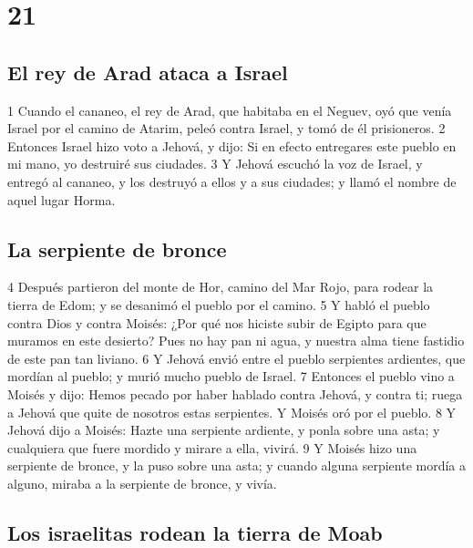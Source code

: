 \chapter{21}

\section*{El rey de Arad ataca a Israel}

1 Cuando el cananeo, el rey de Arad, que habitaba en el Neguev, oyó que venía Israel  por el camino de Atarim, peleó contra Israel, y tomó de él prisioneros.
2 Entonces Israel hizo voto a Jehová, y dijo: Si en efecto entregares este pueblo en mi mano, yo destruiré sus ciudades.
3 Y Jehová escuchó la voz de Israel, y entregó al cananeo, y los destruyó a ellos y a sus ciudades; y llamó el nombre de aquel lugar Horma.

\section*{La serpiente de bronce }

4 Después partieron del monte de Hor, camino del Mar Rojo, para rodear la tierra de Edom; y se desanimó el pueblo por el camino.
5 Y habló el pueblo contra Dios y contra Moisés: ¿Por qué nos hiciste subir de Egipto para que muramos en este desierto? Pues no hay pan ni agua, y nuestra alma tiene fastidio de este pan tan liviano.
6 Y Jehová envió entre el pueblo serpientes ardientes, que mordían al pueblo; y murió mucho pueblo de Israel.
7 Entonces el pueblo vino a Moisés y dijo: Hemos pecado por haber hablado contra Jehová, y contra ti; ruega a Jehová que quite de nosotros estas serpientes. Y Moisés oró por el pueblo.
8 Y Jehová dijo a Moisés: Hazte una serpiente ardiente, y ponla sobre una asta; y cualquiera que fuere mordido y mirare a ella, vivirá.
9 Y Moisés hizo una serpiente de bronce, y la puso sobre una asta; y cuando alguna serpiente mordía a alguno, miraba a la serpiente de bronce, y vivía.

\section*{Los israelitas rodean la tierra de Moab}

